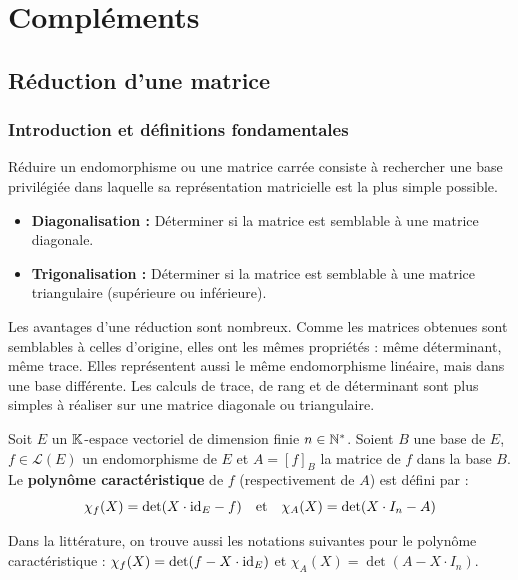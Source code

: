 \documentclass[12pt, a4paper]{report}
\begin{document}
\chapter{Compléments}

\section{Réduction d'une matrice}

\subsection{Introduction et définitions fondamentales}

\begin{definition}
    Réduire un endomorphisme ou une matrice carrée consiste à rechercher une base privilégiée dans laquelle sa représentation matricielle est la plus simple possible.
    \begin{itemize}
        \item \textbf{Diagonalisation :} Déterminer si la matrice est semblable à une matrice diagonale.
        \item \textbf{Trigonalisation :} Déterminer si la matrice est semblable à une matrice triangulaire (supérieure ou inférieure).
    \end{itemize}
\end{definition}

Les avantages d'une réduction sont nombreux. Comme les matrices obtenues sont semblables à celles d'origine, elles ont les mêmes propriétés : même déterminant, même trace. Elles représentent aussi le même endomorphisme linéaire, mais dans une base différente. Les calculs de trace, de rang et de déterminant sont plus simples à réaliser sur une matrice diagonale ou triangulaire.

\begin{definition}
    Soit $E$ un $\mathbb{K}$-espace vectoriel de dimension finie $n \in \mathbb{N}^*$. Soient $B$ une base de $E$, $f \in \mathcal{L}(E)$ un endomorphisme de $E$ et $A = [f]_B$ la matrice de $f$ dans la base $B$. Le \textbf{polynôme caractéristique} de $f$ (respectivement de $A$) est défini par :
    $$\chi_f(X) = \det(X \cdot \mathrm{id}_E - f) \quad \text{et} \quad \chi_A(X) = \det(X \cdot I_n - A)$$
\end{definition}

Dans la littérature, on trouve aussi les notations suivantes pour le polynôme caractéristique : $\chi_f(X) = \det(f - X \cdot \mathrm{id}_E)$ et $\chi_A(X) = \det(A - X \cdot I_n)$. 
\end{document}

